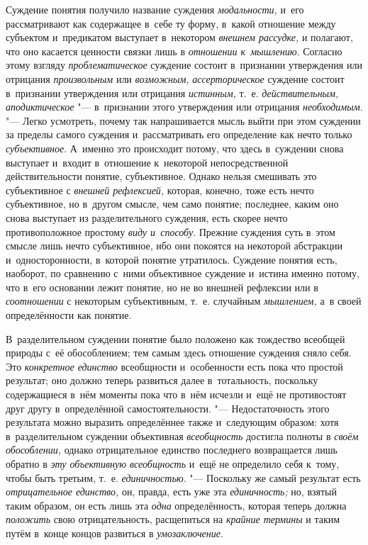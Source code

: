 Суждение понятия получило название суждения
{\em модальности,} и~его
рассматривают как содержащее в~себе ту форму, в~какой отношение между
субъектом и~предикатом выступает в~некотором
{\em внешнем рассудке,} и
полагают, что оно касается ценности связки лишь в
{\em отношении к~мышлению}.
Согласно этому взгляду
{\em проблематическое}
суждение состоит в~признании утверждения или отрицания
{\em произвольным} или
{\em возможным,}
{\em ассерторическое}
суждение состоит в~признании утверждения или отрицания
{\em истинным,} т.~е.
{\em действительным,}
{\em аподиктическое} "--- в~признании этого утверждения или отрицания
{\em необходимым}. "---
Легко усмотреть, почему так напрашивается мысль выйти при
этом суждении за пределы самого суждения и~рассматривать его определение
как нечто только {\em субъективное}.
А~именно это происходит потому, что здесь в~суждении снова
выступает и~входит в~отношение к~некоторой непосредственной
действительности понятие, субъективное. Однако нельзя смешивать это
субъективное с {\em внешней
рефлексией,} которая, конечно, тоже есть нечто субъективное,
но в~другом смысле, чем само понятие; последнее, каким оно снова выступает
из разделительного суждения, есть скорее нечто противоположное простому
{\em виду и~способу}.
Прежние суждения суть в~этом смысле лишь нечто субъективное,
ибо они покоятся на некоторой абстракции и~односторонности, в~которой
понятие утратилось. Суждение понятия есть, наоборот, по сравнению с~ними
объективное суждение и~истина именно потому, что в~его основании лежит
понятие, но не во внешней рефлексии или в
{\em соотношении} с
некоторым субъективным, т.~е. случайным
{\em мышлением,} а~в
своей определённости как понятие.

В~разделительном суждении понятие было положено как тождество
всеобщей природы с~её обособлением; тем самым здесь отношение суждения
сняло себя. Это {\em конкретное
единство} всеобщности и~особенности есть пока что простой
результат; оно должно теперь развиться далее в~тотальность, поскольку
содержащиеся в~нём моменты пока что в~нём исчезли и~ещё не противостоят
друг другу в~определённой самостоятельности. "---
Недостаточность этого результата можно выразить определённее
также и~следующим образом: хотя в~разделительном суждении объективная
{\em всеобщность}
достигла полноты в
{\em своём обособлении,}
однако отрицательное единство последнего возвращается лишь
обратно в {\em эту объективную
всеобщность} и~ещё не определило себя к~тому, чтобы быть
третьим, т.~е. {\em единичностью}. "---
Поскольку же самый результат есть
{\em отрицательное единство,}
он, правда, есть уже эта
{\em единичность;} но,
взятый таким образом, он есть лишь эта
{\em одна}
определённость, которая теперь должна
{\em положить} свою
отрицательность, расщепиться на
{\em крайние термины} и
таким путём в~конце концов развиться в
{\em умозаключение}.

